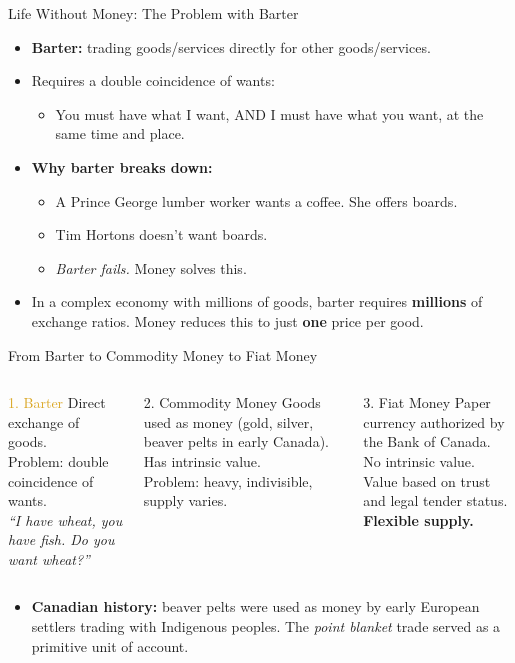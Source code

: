 \documentclass[aspectratio=169]{beamer}
\begin{document}
\begin{frame}{Life Without Money: The Problem with Barter}
\transfade
\begin{itemize}
  \item \textbf{Barter:} trading goods/services directly for other goods/services.
  \item Requires a \alert{double coincidence of wants}:
  \begin{itemize}
    \item You must have what I want, AND I must have what you want, at the same time and place.
  \end{itemize}
  \item \textbf{Why barter breaks down:}
  \begin{itemize}
    \item A Prince George lumber worker wants a coffee. She offers boards.
    \item Tim Hortons doesn't want boards.
    \item \textit{Barter fails.} Money solves this.
  \end{itemize}
  \item In a complex economy with millions of goods, barter requires \textbf{millions} of exchange ratios. Money reduces this to just \textbf{one} price per good.
\end{itemize}
\end{frame}

\begin{frame}{From Barter to Commodity Money to Fiat Money}
\transfade
\begin{columns}
\begin{block}{\textcolor{goldenrod}{1. Barter}}
Direct exchange of goods.\\
Problem: double coincidence of wants.\\
\textit{``I have wheat, you have fish. Do you want wheat?''}
\end{block}
\begin{block}{\textcolor{deeporange}{2. Commodity Money}}
Goods used as money (gold, silver, beaver pelts in early Canada).\\
Has intrinsic value.\\
Problem: heavy, indivisible, supply varies.
\end{block}
\begin{block}{\textcolor{accent}{3. Fiat Money}}
Paper currency authorized by the Bank of Canada.\\
No intrinsic value.\\
Value based on trust and legal tender status.\\
\textbf{Flexible supply.}
\end{block}
\end{columns}
\vspace{0.5em}
\begin{itemize}
  \item \textbf{Canadian history:} beaver pelts were used as money by early European settlers trading with Indigenous peoples. The \textit{point blanket} trade served as a primitive unit of account.
\end{itemize}
\end{frame}
\end{document}
